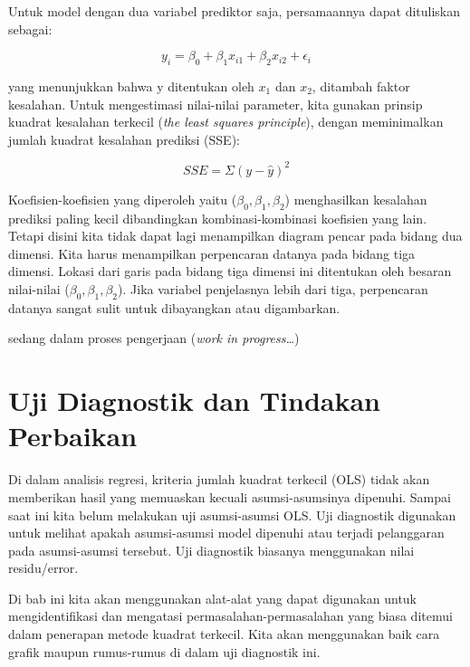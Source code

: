 \documentclass[
]{book}
\begin{document}
Untuk model dengan dua variabel prediktor saja, persamaannya dapat dituliskan sebagai:

\begin{equation} 
y_i=\beta_0 + \beta_1x_{i1} + \beta_2x_{i2} + \epsilon_i
\label{eq:persamaan-2var}
\end{equation}

yang menunjukkan bahwa y ditentukan oleh \(x_1\) dan \(x_2\), ditambah faktor kesalahan. Untuk mengestimasi nilai-nilai parameter, kita gunakan prinsip kuadrat kesalahan terkecil (\emph{the least squares principle}), dengan meminimalkan jumlah kuadrat kesalahan prediksi (SSE):

\begin{equation}
SSE = \Sigma(y - \hat y)^2
\label{eq:persamaan-sse}
\end{equation}

Koefisien-koefisien yang diperoleh yaitu (\(\beta_0, \beta_1, \beta_2\)) menghasilkan kesalahan prediksi paling kecil dibandingkan kombinasi-kombinasi koefisien yang lain.
Tetapi disini kita tidak dapat lagi menampilkan diagram pencar pada bidang dua dimensi. Kita harus menampilkan perpencaran datanya pada bidang tiga dimensi. Lokasi dari garis pada bidang tiga dimensi ini ditentukan oleh besaran nilai-nilai (\(\beta_0, \beta_1, \beta_2\)). Jika variabel penjelasnya lebih dari tiga, perpencaran datanya sangat sulit untuk dibayangkan atau digambarkan.

sedang dalam proses pengerjaan (\emph{work in progress\ldots{}})

\hypertarget{uji-diagnostik-dan-tindakan-perbaikan}{%
\chapter{Uji Diagnostik dan Tindakan Perbaikan}\label{uji-diagnostik-dan-tindakan-perbaikan}}

Di dalam analisis regresi, kriteria jumlah kuadrat terkecil (OLS) tidak akan memberikan hasil yang memuaskan kecuali asumsi-asumsinya dipenuhi. Sampai saat ini kita belum melakukan uji asumsi-asumsi OLS. Uji diagnostik digunakan untuk melihat apakah asumsi-asumsi model dipenuhi atau terjadi pelanggaran pada asumsi-asumsi tersebut. Uji diagnostik biasanya menggunakan nilai residu/error.

Di bab ini kita akan menggunakan alat-alat yang dapat digunakan untuk mengidentifikasi dan mengatasi permasalahan-permasalahan yang biasa ditemui dalam penerapan metode kuadrat terkecil. Kita akan menggunakan baik cara grafik maupun rumus-rumus di dalam uji diagnostik ini.
\end{document}
